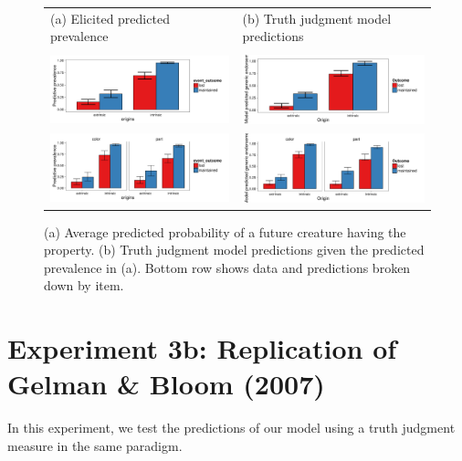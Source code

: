 \documentclass[12pt,letterpaper]{article}
\begin{document}
\begin{figure}
\begin{tabular}{l l}
(a) Elicited predicted prevalence & (b) Truth judgment model predictions\\
\\
\centering
    \includegraphics[width=0.5\columnwidth]{dobles-predictive.pdf} &
    \includegraphics[width=0.5\columnwidth]{dobles-model.pdf} \\
    \includegraphics[width=0.5\columnwidth]{dobles-predictive-byItem.pdf} &
      \includegraphics[width=0.5\columnwidth]{dobles-model-byItem.pdf} \\
\end{tabular}
    \caption{
    (a) Average predicted probability of a future creature having the property. (b) Truth judgment model predictions given the predicted prevalence in (a).
    Bottom row shows data and predictions broken down by item.
  }
  \label{fig:dobles-predictive}
\end{figure}

\section*{Experiment 3b: Replication of Gelman \& Bloom (2007)}

In this experiment, we test the predictions of our model using a truth judgment measure in the same paradigm.
\end{document}
